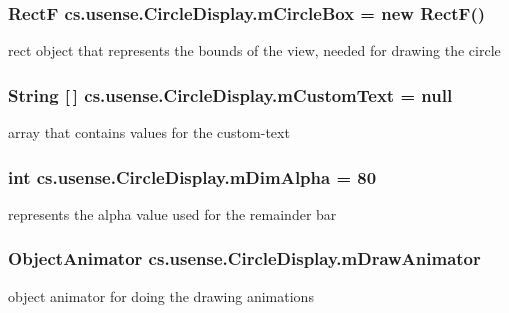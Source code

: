 \subsubsection[{m\+Circle\+Box}]{\setlength{\rightskip}{0pt plus 5cm}Rect\+F cs.\+usense.\+Circle\+Display.\+m\+Circle\+Box = new Rect\+F()\hspace{0.3cm}{\ttfamily [private]}}\label{classcs_1_1usense_1_1_circle_display_ae25a9c68b75ab460d8fc52214a9cb7fd}
rect object that represents the bounds of the view, needed for drawing the circle \hypertarget{classcs_1_1usense_1_1_circle_display_a0a78e56096413f30c7d66f496ad6a253}{}
\subsubsection[{m\+Custom\+Text}]{\setlength{\rightskip}{0pt plus 5cm}String \mbox{[}$\,$\mbox{]} cs.\+usense.\+Circle\+Display.\+m\+Custom\+Text = null\hspace{0.3cm}{\ttfamily [private]}}\label{classcs_1_1usense_1_1_circle_display_a0a78e56096413f30c7d66f496ad6a253}
array that contains values for the custom-\/text \hypertarget{classcs_1_1usense_1_1_circle_display_a20e65c1ce5ef4046b08485a4d2bfc403}{}
\subsubsection[{m\+Dim\+Alpha}]{\setlength{\rightskip}{0pt plus 5cm}int cs.\+usense.\+Circle\+Display.\+m\+Dim\+Alpha = 80\hspace{0.3cm}{\ttfamily [private]}}\label{classcs_1_1usense_1_1_circle_display_a20e65c1ce5ef4046b08485a4d2bfc403}
represents the alpha value used for the remainder bar \hypertarget{classcs_1_1usense_1_1_circle_display_a40384ff97e0c9f940d669910cc5427d8}{}
\subsubsection[{m\+Draw\+Animator}]{\setlength{\rightskip}{0pt plus 5cm}Object\+Animator cs.\+usense.\+Circle\+Display.\+m\+Draw\+Animator\hspace{0.3cm}{\ttfamily [private]}}\label{classcs_1_1usense_1_1_circle_display_a40384ff97e0c9f940d669910cc5427d8}
object animator for doing the drawing animations \hypertarget{classcs_1_1usense_1_1_circle_display_ad73b22a7a1f3f35d8544cdb7c80f42b2}{}

